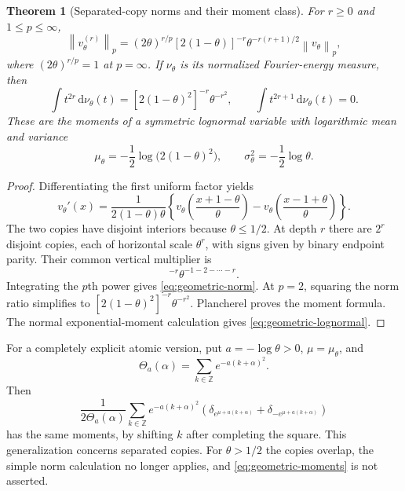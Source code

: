 \documentclass[11pt,a4paper]{article}
\numberwithin{equation}{section}
\newtheorem{theorem}{Theorem}[section]
\theoremstyle{definition}
\newcommand{\Z}{\mathbb Z}
\newcommand{\dd}{\,\mathrm d}
\newcommand{\norm}[1]{\left\lVert #1\right\rVert}
\begin{document}
\begin{theorem}[Separated-copy norms and their moment class]\label{thm:geometric}
For $r\geq0$ and $1\leq p\leq\infty$,
\begin{equation}
 \norm{v_\theta^{(r)}}_p
 =(2\theta)^{r/p}[2(1-\theta)]^{-r}
       \theta^{-r(r+1)/2}\norm{v_\theta}_p,
 \label{eq:geometric-norm}
\end{equation}
where $(2\theta)^{r/p}=1$ at $p=\infty$.
If $\nu_\theta$ is its normalized Fourier-energy measure, then
\begin{equation}
 \int t^{2r}\dd\nu_\theta(t)
 =[2(1-\theta)^2]^{-r}\theta^{-r^2},
 \qquad \int t^{2r+1}\dd\nu_\theta(t)=0.
 \label{eq:geometric-moments}
\end{equation}
These are the moments of a symmetric lognormal variable with
logarithmic mean and variance
\begin{equation}
 \mu_\theta=-\frac12\log\bigl(2(1-\theta)^2\bigr),
 \qquad \sigma_\theta^2=-\frac12\log\theta.
 \label{eq:geometric-lognormal}
\end{equation}
\end{theorem}
\begin{proof}
Differentiating the first uniform factor yields
\begin{equation}
 v_\theta'(x)=\frac1{2(1-\theta)\theta}
 \left\{v_\theta\left(\frac{x+1-\theta}{\theta}\right)
       -v_\theta\left(\frac{x-1+\theta}{\theta}\right)\right\}.
 \label{eq:geometric-refinement}
\end{equation}
The two copies have disjoint interiors because $\theta\leq1/2$.
At depth $r$ there are $2^r$ disjoint copies, each of horizontal
scale $\theta^r$, with signs given by binary endpoint parity.
Their common vertical multiplier is
\begin{equation}
 [2(1-\theta)]^{-r}\theta^{-1-2-\cdots-r}.
\end{equation}
Integrating the $p$th power gives \eqref{eq:geometric-norm}.
At $p=2$, squaring the norm ratio simplifies to
$[2(1-\theta)^2]^{-r}\theta^{-r^2}$. Plancherel proves the
moment formula. The normal exponential-moment calculation gives
\eqref{eq:geometric-lognormal}.
\end{proof}

For a completely explicit atomic version, put $a=-\log\theta>0$,
$\mu=\mu_\theta$, and
\begin{equation}
 \Theta_a(\alpha)=\sum_{k\in\Z}e^{-a(k+\alpha)^2}.
\end{equation}
Then
\begin{equation}
 \frac1{2\Theta_a(\alpha)}\sum_{k\in\Z}e^{-a(k+\alpha)^2}
 \left(\delta_{e^{\mu+a(k+\alpha)}}+
       \delta_{-e^{\mu+a(k+\alpha)}}\right)
 \label{eq:general-atomic}
\end{equation}
has the same moments, by shifting $k$ after completing the square.
This generalization concerns separated copies. For $\theta>1/2$
the copies overlap, the simple norm calculation no longer applies,
and \eqref{eq:geometric-moments} is not asserted.
\end{document}
